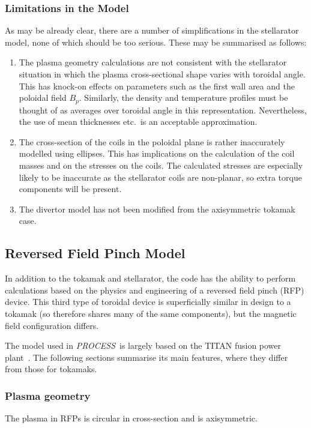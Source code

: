 \documentclass[11pt,a4paper]{report}
\newcommand{\PS}{\mbox{\it PROCESS\/ }}
\begin{document}
\subsubsection{Limitations in the Model}
As may be already clear, there are a number of simplifications in the
stellarator model, none of which should be too serious. These may be
summarised as follows:
\begin{enumerate}
\item The plasma geometry calculations are not consistent with the
stellarator situation in which the plasma cross-sectional shape varies with
toroidal angle. This has knock-on effects on parameters such as the first wall
area and the poloidal field $B_p$. Similarly, the density and temperature
profiles must be thought of as averages over toroidal angle in this
representation. Nevertheless, the use of mean thicknesses etc.\ is an
acceptable approximation.
\item The cross-section of the coils in the poloidal plane is rather
inaccurately modelled using ellipses. This has implications on the calculation
of the coil masses and on the stresses on the coils. The calculated stresses
are especially likely to be inaccurate as the stellarator coils are
non-planar, so extra torque components will be present.
\item The divertor model has not been modified from the axisymmetric tokamak
case.
\end{enumerate}

\subsection{Reversed Field Pinch Model}
In addition to the tokamak and stellarator, the code has the ability to
perform calculations based on the physics and engineering of a reversed field
pinch (RFP) device. This third type of toroidal device is superficially
similar in design to a tokamak (so therefore shares many of the same
components), but the magnetic field configuration differs.

The model used in \PS is largely based on the TITAN fusion power
plant~\cite{titan1,titan2}. The following sections summarise its main
features, where they differ from those for tokamaks.

\subsubsection{Plasma geometry}
The plasma in RFPs is circular in cross-section and is axisymmetric.
\end{document}
